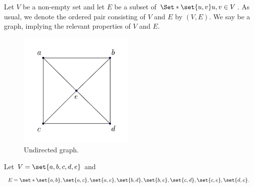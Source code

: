 Let $V$ be a non-empty set and let $E$ be a subset of $\Set*{\set{u, v}}{u, v \in V}$.
As usual, we denote the ordered pair consisting of $V$ and $E$ by $(V, E)$.
We say  be a graph, implying the relevant properties of $V$ and $E$.


\begin{figure}
  \centering
  \includegraphics[width=0.5\textwidth]{graphics_included/undirected_graph}
  \caption{Undirected graph.}
\end{figure}

Let $V = \set{a, b, c, d, e}$
and
$$
  E = \set*{\set{a, b}, \set{a, c}, \set{a, e}, \set{b, d}, \set{b, e}, \set{c, d}, \set{c, e}, \set{d,e}}.
$$
\strats
